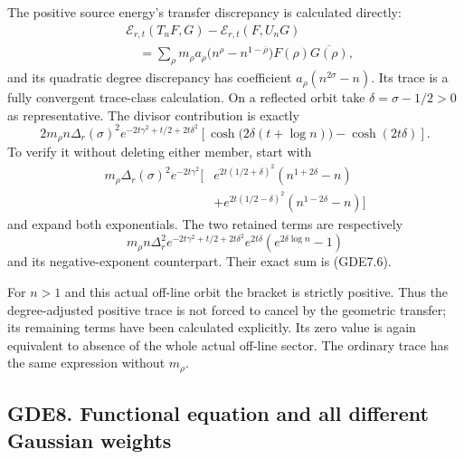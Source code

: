 The positive source energy's transfer discrepancy is calculated
directly: \[
\begin{aligned}
&\mathcal E_{r,t}(T_nF,G)-\mathcal E_{r,t}(F,U_nG)\\
&\quad=\sum_\rho m_\rho a_\rho
\bigl(n^\rho-n^{1-\overline\rho}\bigr)
F(\rho)\overline{G(\rho)},
\end{aligned}
\tag{GDE7.5}
\] and its quadratic degree discrepancy has coefficient
\(a_\rho(n^{2\sigma}-n)\). Its trace is a fully convergent trace-class
calculation. On a reflected orbit take \(\delta=\sigma-1/2>0\) as
representative. The divisor contribution is exactly \[
\boxed{2m_\rho n\Delta_r(\sigma)^2
e^{-2t\gamma^2+t/2+2t\delta^2}
\left[\cosh\bigl(2\delta(t+\log n)\bigr)
-\cosh(2t\delta)\right].}
\tag{GDE7.6}
\] To verify it without deleting either member, start with \[
\begin{aligned}
m_\rho\Delta_r(\sigma)^2e^{-2t\gamma^2}\bigl[&e^{2t(1/2+\delta)^2}(n^{1+2\delta}-n)
\\&+e^{2t(1/2-\delta)^2}(n^{1-2\delta}-n)\bigr]
\end{aligned}
\] and expand both exponentials. The two retained terms are respectively
\[
m_\rho n\Delta_r^2e^{-2t\gamma^2+t/2+2t\delta^2}
e^{2t\delta}(e^{2\delta\log n}-1)
\] and its negative-exponent counterpart. Their exact sum is (GDE7.6).

For \(n>1\) and this actual off-line orbit the bracket is strictly
positive. Thus the degree-adjusted positive trace is not forced to
cancel by the geometric transfer; its remaining terms have been
calculated explicitly. Its zero value is again equivalent to absence of
the whole actual off-line sector. The ordinary trace has the same
expression without \(m_\rho\).

\subsection{GDE8. Functional equation and all different Gaussian
weights}\label{gde8.-functional-equation-and-all-different-gaussian-weights}

